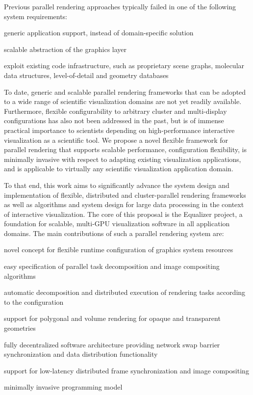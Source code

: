 Previous parallel rendering approaches typically failed in one of the following
system requirements:
%
\begin{compactenum}
\item generic application support, instead of domain-specific solution
\item scalable abstraction of the graphics layer
\item exploit existing code infrastructure, such as proprietary scene graphs, molecular data structures, level-of-detail and geometry databases
\end{compactenum}

To date, generic and scalable parallel rendering frameworks that can be adopted
to a wide range of scientific visualization domains are not yet readily
available. Furthermore, flexible configurability to arbitrary cluster and
multi-display configurations has also not been addressed in the past, but is of
immense practical importance to scientists depending on high-performance
interactive visualization as a scientific tool. We propose a novel flexible
framework for parallel rendering that supports scalable performance,
configuration flexibility, is minimally invasive with respect to adapting
existing visualization applications, and is applicable to virtually any
scientific visualization application domain.

To that end, this work aims to significantly advance the system design and
implementation of flexible, distributed and cluster-parallel rendering
frameworks as well as algorithms and system design for large data processing in
the context of interactive visualization. The core of this proposal is the
Equalizer project, a foundation for scalable, multi-GPU visualization software
in all application domains. The main contributions of such a parallel rendering
system are:
%
\begin{compactenum}
\item novel concept for flexible runtime configuration of graphics system resources
\item easy specification of parallel task decomposition and image compositing algorithms
\item automatic decomposition and distributed execution of rendering tasks according to the configuration
\item support for polygonal and volume rendering for opaque and transparent geometries
\item fully decentralized software architecture providing network swap barrier synchronization and data distribution functionality
\item support for low-latency distributed frame synchronization and image compositing
\item minimally invasive programming model
\end{compactenum}

